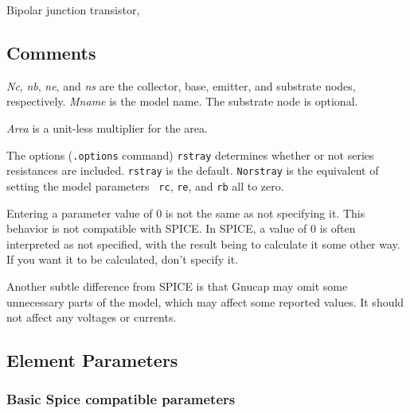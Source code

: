 Bipolar junction transistor,
\subsection{Comments}

{\it Nc}, {\it nb}, {\it ne}, and {\it ns} are the collector, base,
emitter, and substrate nodes, respectively.  {\it Mname} is the model
name.  The substrate node is optional.

{\it Area} is a unit-less multiplier for the area.

The options ({\tt .options} command) {\tt rstray} determines whether or
not series resistances are included. {\tt rstray} is the default.
{\tt Norstray} is the equivalent of setting the model parameters {\tt
rc}, {\tt re}, and {\tt rb} all to zero.

Entering a parameter value of 0 is not the same as not specifying
it.  This behavior is not compatible with SPICE.  In SPICE, a value
of 0 is often interpreted as not specified, with the result being
to calculate it some other way.  If you want it to be calculated,
don't specify it.

Another subtle difference from SPICE is that Gnucap may omit some
unnecessary parts of the model, which may affect some reported
values.  It should not affect any voltages or currents.
\subsection{Element Parameters}

\subsubsection{Basic Spice compatible parameters}

